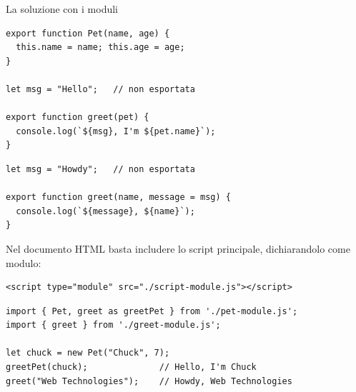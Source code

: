 \begin{esempio}{La soluzione con i moduli}
\begin{affianco}[0.52]
\begin{lstlisting}[style=js, name=pet-module.js]
export function Pet(name, age) {
  this.name = name; this.age = age;
}

let msg = "Hello";   // non esportata

export function greet(pet) {
  console.log(`${msg}, I'm ${pet.name}`);
}
\end{lstlisting}
\risultato
\begin{lstlisting}[style=js, name=greet-module.js]
let msg = "Howdy";   // non esportata

export function greet(name, message = msg) {
  console.log(`${message}, ${name}`);
}
\end{lstlisting}
\end{affianco}

Nel documento HTML basta includere lo script principale, dichiarandolo come
modulo:

\begin{lstlisting}[style=html]
<script type="module" src="./script-module.js"></script>
\end{lstlisting}

\begin{affianco}[0.52][c]
\begin{lstlisting}[style=js, name=script-module.js]
import { Pet, greet as greetPet } from './pet-module.js';
import { greet } from './greet-module.js';

let chuck = new Pet("Chuck", 7);
greetPet(chuck);              // Hello, I'm Chuck
greet("Web Technologies");    // Howdy, Web Technologies
\end{lstlisting}
\risultato
\begin{immagine}
\end{immagine}
\end{affianco}


\end{esempio}
